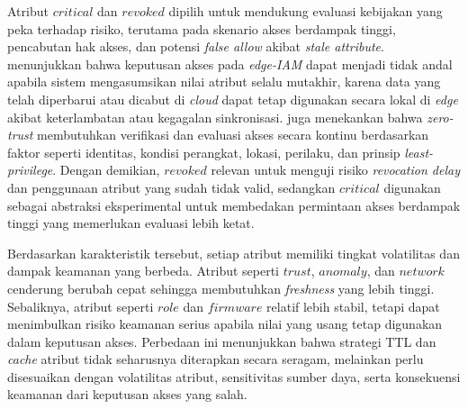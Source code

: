Atribut $critical$ dan $revoked$ dipilih untuk mendukung evaluasi kebijakan yang peka terhadap risiko, terutama pada skenario akses berdampak tinggi, pencabutan hak akses, dan potensi \textit{false allow} akibat \textit{stale attribute}. \textcite{wang_edge-enabled_2025} menunjukkan bahwa keputusan akses pada \textit{edge-IAM} dapat menjadi tidak andal apabila sistem mengasumsikan nilai atribut selalu mutakhir, karena data yang telah diperbarui atau dicabut di \textit{cloud} dapat tetap digunakan secara lokal di \textit{edge} akibat keterlambatan atau kegagalan sinkronisasi. \textcite{azad_verify_2024} juga menekankan bahwa \textit{zero-trust} membutuhkan verifikasi dan evaluasi akses secara kontinu berdasarkan faktor seperti identitas, kondisi perangkat, lokasi, perilaku, dan prinsip \textit{least-privilege}. Dengan demikian, $revoked$ relevan untuk menguji risiko \textit{revocation delay} dan penggunaan atribut yang sudah tidak valid, sedangkan $critical$ digunakan sebagai abstraksi eksperimental untuk membedakan permintaan akses berdampak tinggi yang memerlukan evaluasi lebih ketat.

Berdasarkan karakteristik tersebut, setiap atribut memiliki tingkat volatilitas dan dampak keamanan yang berbeda. Atribut seperti $trust$, $anomaly$, dan $network$ cenderung berubah cepat sehingga membutuhkan \textit{freshness} yang lebih tinggi. Sebaliknya, atribut seperti $role$ dan $firmware$ relatif lebih stabil, tetapi dapat menimbulkan risiko keamanan serius apabila nilai yang usang tetap digunakan dalam keputusan akses. Perbedaan ini menunjukkan bahwa strategi TTL dan \textit{cache} atribut tidak seharusnya diterapkan secara seragam, melainkan perlu disesuaikan dengan volatilitas atribut, sensitivitas sumber daya, serta konsekuensi keamanan dari keputusan akses yang salah.
